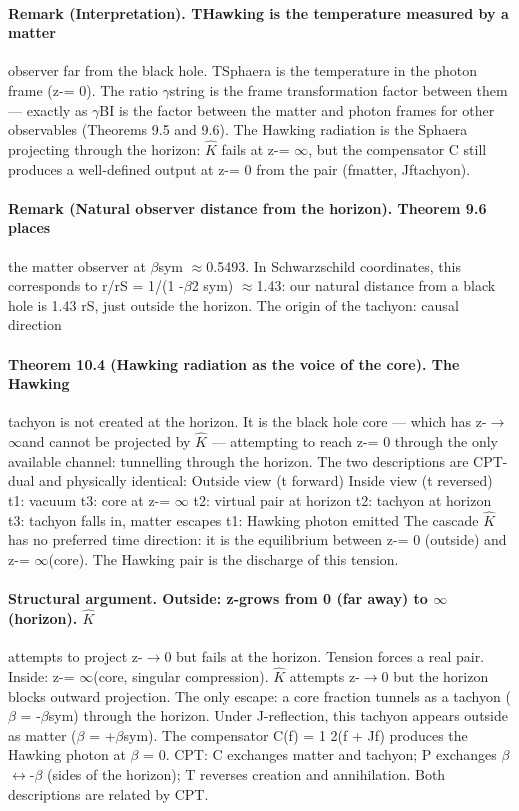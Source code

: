 \paragraph*{Remark (Interpretation). THawking is the temperature measured by a matter}
observer far from the black hole. TSphaera is the temperature in the photon frame (z-= 0). The ratio $\gamma$string is the frame transformation factor between them --- exactly as $\gamma$BI is the factor between the matter and photon frames for other observables (Theorems 9.5 and 9.6). The Hawking radiation is the Sphaera projecting through the horizon: $\hat K$ fails at z-= $\infty$, but the compensator C still produces a well-defined output at z-= 0 from the pair (fmatter, Jftachyon).
\paragraph*{Remark (Natural observer distance from the horizon). Theorem 9.6 places}
the matter observer at $\beta$sym $\approx$0.5493. In Schwarzschild coordinates, this corresponds to r/rS = 1/(1 -$\beta$2 sym) $\approx$1.43: our natural distance from a black hole is 1.43 rS, just outside the horizon. The origin of the tachyon: causal direction
\paragraph*{Theorem 10.4 (Hawking radiation as the voice of the core). The Hawking}
tachyon is not created at the horizon. It is the black hole core --- which has z-$\to$$\infty$and cannot be projected by $\hat K$ --- attempting to reach z-= 0 through the only available channel: tunnelling through the horizon. The two descriptions are CPT-dual and physically identical: Outside view (t forward) Inside view (t reversed) t1: vacuum t3: core at z-= $\infty$ t2: virtual pair at horizon t2: tachyon at horizon t3: tachyon falls in, matter escapes t1: Hawking photon emitted The cascade $\hat K$ has no preferred time direction: it is the equilibrium between z-= 0 (outside) and z-= $\infty$(core). The Hawking pair is the discharge of this tension.
\paragraph*{Structural argument. Outside: z-grows from 0 (far away) to $\infty$(horizon). $\hat K$}
attempts to project z-$\to$0 but fails at the horizon. Tension forces a real pair. Inside: z-= $\infty$(core, singular compression). $\hat K$ attempts z-$\to$0 but the horizon blocks outward projection. The only escape: a core fraction tunnels as a tachyon ($\beta$ = -$\beta$sym) through the horizon. Under J-reflection, this tachyon appears outside as matter ($\beta$ = +$\beta$sym). The compensator C(f) = 1 2(f + Jf) produces the Hawking photon at $\beta$ = 0. CPT: C exchanges matter and tachyon; P exchanges $\beta$ $\leftrightarrow$-$\beta$ (sides of the horizon); T reverses creation and annihilation. Both descriptions are related by CPT.
